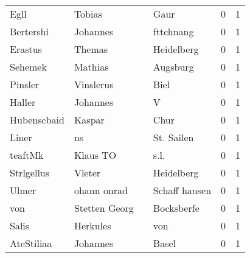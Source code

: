\begin{tabular}{llllrr}
                     Egll &                             Tobias &             &                                        Gaur &          0 &         1 \\
                Bertershi &                           Johannes &             &                                   fttchnang &          0 &         1 \\
                  Erastus &                             Themas &             &                                  Heidelberg &          0 &         1 \\
                  Sehemek &                            Mathias &             &                                    Augsburg &          0 &         1 \\
                  Pinsler &                          Vinslerus &             &                                        Biel &          0 &         1 \\
                   Haller &                           Johannes &             &                                           V &          0 &         1 \\
              Hubenscbaid &                             Kaspar &             &                                        Chur &          0 &         1 \\
                    Liner &                                 ns &             &                                  St. Sailen &          0 &         1 \\
                  teaftMk &                           Klaus TO &             &                                        s.l. &          0 &         1 \\
               Strlgellus &                             Vleter &             &                                  Heidelberg &          0 &         1 \\
                    Ulmer &                        ohann onrad &             &                               Schaff hausen &          0 &         1 \\
                      von &                      Stetten Georg &             &                                  Bocksberfe &          0 &         1 \\
                    Salis &                           Herkules &             &                                         von &          0 &         1 \\
               AteStiliaa &                           Johannes &             &                                       Basel &          0 &         1 \\

\end{tabular}
